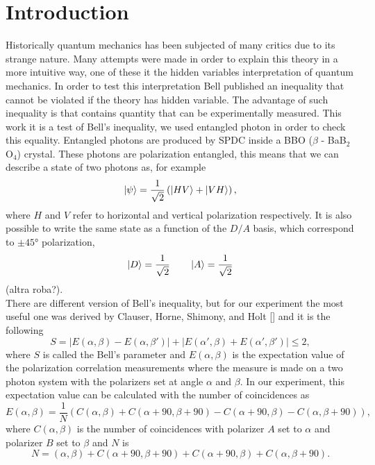 \documentclass[a4paper,10pt]{article}
\begin{document}
\section{Introduction}
Historically quantum mechanics has been subjected of many critics due to its strange nature. Many attempts were made in order to explain this theory in a more intuitive way, one of these it the hidden variables interpretation of quantum mechanics. In order to test this interpretation Bell published an inequality \cite{bellpaper} that cannot be violated if the theory has hidden variable. The advantage of such inequality is that contains quantity that can be experimentally measured. This work it is a test of Bell's inequality, we used entangled photon in order to check this equality. Entangled photons are produced by SPDC inside a BBO ($\beta$ - BaB$_2$O$_4$) crystal. These photons are polarization entangled, this means that we can describe a state of two photons as, for example
\begin{equation}\ket{\psi} = \frac{1}{\sqrt{2}}\left(\ket{HV} + \ket{VH}\right),\end{equation}
where $H$ and $V$ refer to horizontal and vertical polarization respectively. It is also possible to write the same state as a function of the $D/A$ basis, which correspond to $\pm 45$° polarization,
\begin{equation}\ket{D} = \frac{1}{\sqrt{2}} \qquad \ket{A} = \frac{1}{\sqrt{2}}\end{equation}
(altra roba?).\\
There are different version of Bell's inequality, but for our experiment the most useful one was derived by Clauser, Horne, Shimony, and Holt [] and it is the following
\begin{equation}S = |E(\alpha,\beta)-E(\alpha,\beta')|+|E(\alpha',\beta)+E(\alpha',\beta')|\leq 2,\end{equation}
where $S$ is called the Bell's parameter and $E(\alpha,\beta)$ is the expectation value of the polarization correlation measurements where the measure is made on a two photon system with the polarizers set at angle $\alpha$ and $\beta.$ In our experiment, this expectation value can be calculated with the number of coincidences as
\begin{equation}E(\alpha,\beta) = \frac{1}{N}(C(\alpha,\beta)+C(\alpha+90,\beta+90)-C(\alpha+90,\beta)-C(\alpha,\beta+90)),\end{equation}
where $C(\alpha,\beta)$ is the number of coincidences with polarizer $A$ set to $\alpha$ and polarizer $B$ set to $\beta$ and $N$ is
\begin{equation}N = (\alpha,\beta)+C(\alpha+90,\beta+90)+C(\alpha+90,\beta)+C(\alpha,\beta+90).\end{equation}
\end{document}
